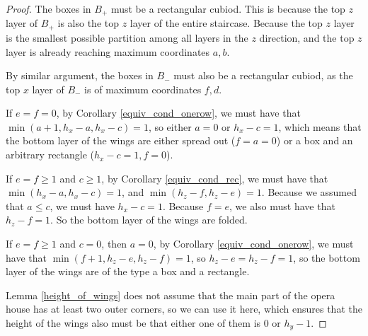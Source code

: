 \documentclass{amsart}[10pt]
\theoremstyle{plain}
\theoremstyle{definition}
\begin{document}
\begin{proof}
The boxes in $B_+$ must be a rectangular cubiod. This is because the top $z$ layer of $B_+$ is also the top $z$ layer of the entire staircase. Because the top $z$ layer is the smallest possible partition among all layers in the $z$ direction, and the top $z$ layer is already reaching maximum coordinates $a, b$. %

By similar argument, the boxes in $B_-$ must also be a rectangular cubiod, as the top $x$ layer of $B_-$ is of maximum coordinates $f, d$.%


If $e=f=0$, by Corollary \ref{equiv_cond_onerow}, we must have that $\min(a+1, h_x-a, h_x-c)=1$, so either $a=0$ or $h_x-c=1$, which means that the bottom layer of the wings are either spread out ($f=a=0$) or a box and an arbitrary rectangle ($h_x-c=1, f=0$).

If $e=f \geq 1$ and $c \geq 1$, by Corollary \ref{equiv_cond_rec}, we must have that $\min(h_x-a, h_x-c)=1$, and $\min(h_z-f, h_z-e)=1$. Because we assumed that $a \leq c$, we must have $h_x-c=1$. Because $f=e$, we also must have that $h_z-f=1$. So the bottom layer of the wings are folded.

If $e=f \geq 1$ and $c = 0$, then $a=0$, by Corollary \ref{equiv_cond_onerow}, we must have that $\min(f+1, h_z-e, h_z-f)=1$, so $h_z-e=h_z-f=1$, so the bottom layer of the wings are of the type a box and a rectangle.

Lemma \ref{height_of_wings} does not assume that the main part of the opera house has at least two outer corners, so we can use it here, which ensures that the height of the wings also must be that either one of them is $0$ or $h_y-1$. 


\end{proof}
\end{document}
